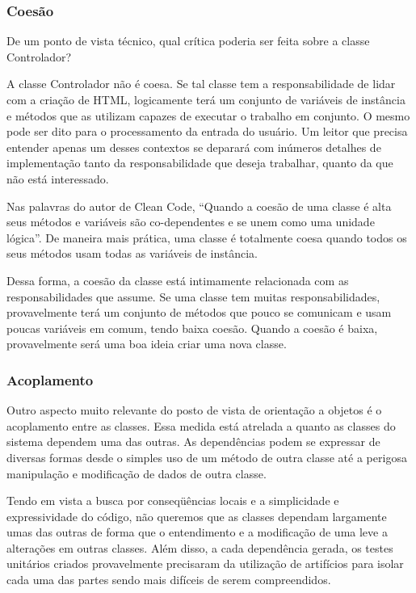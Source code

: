 \subsubsection{Coesão}
De um ponto de vista técnico, qual crítica poderia ser feita sobre a classe Controlador? 
	
A classe Controlador não é coesa. Se tal classe tem a responsabilidade de lidar com a criação de HTML, logicamente terá um conjunto de variáveis de instância e métodos que as utilizam capazes de executar o trabalho em conjunto. O mesmo pode ser dito para o processamento da entrada do usuário. Um leitor que precisa entender apenas um desses contextos se deparará com inúmeros detalhes de implementação tanto da responsabilidade que deseja trabalhar, quanto da que não está interessado.
	
Nas palavras do autor de Clean Code, “Quando a coesão de uma classe é alta seus métodos e variáveis são co-dependentes e se unem como uma unidade lógica”. De maneira mais prática, uma classe é totalmente coesa quando todos os seus métodos usam todas as variáveis de instância.
	
Dessa forma, a coesão da classe está intimamente relacionada com as responsabilidades que assume. Se uma classe tem muitas responsabilidades, provavelmente terá um conjunto de métodos que pouco se comunicam e usam poucas variáveis em comum, tendo baixa coesão. Quando a coesão é baixa, provavelmente será uma boa ideia criar uma nova classe.

\subsubsection{Acoplamento}
Outro aspecto muito relevante do posto de vista de orientação a objetos é o acoplamento entre as classes. Essa medida está atrelada a quanto as classes do sistema dependem uma das outras. As  dependências podem se expressar de diversas formas desde o simples uso de um método de outra classe até a perigosa manipulação e modificação de dados de outra classe.
	
Tendo em vista a busca por conseqüências locais e a simplicidade e expressividade do código, não queremos que as classes dependam largamente umas das outras de forma que o entendimento e a modificação de uma leve a alterações em outras classes. Além disso, a cada dependência gerada, os testes unitários criados provavelmente precisaram da utilização de artifícios para isolar cada uma das partes sendo mais difíceis de serem compreendidos.
	
